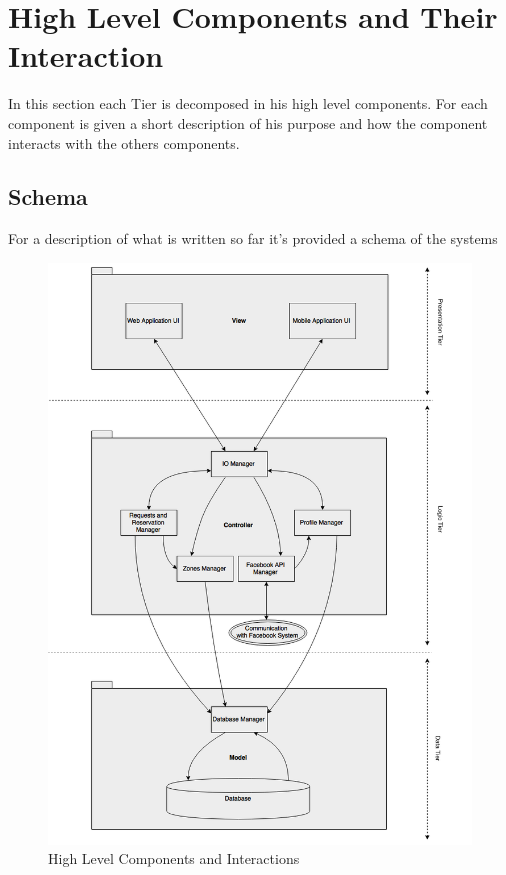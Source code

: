 \documentclass[../../../../dd.tex]{subfiles}
\begin{document}
	\section{High Level Components and Their Interaction}
		In this section each Tier is decomposed in his high level components. For each component is given a short description of his purpose and how the component interacts with the others components.
	
		

		

		

		\subsection{Schema}
			For a description of what is written so far it's provided a schema of the systems

			\begin{figure}[H]
				\centering
				\includegraphics[width=\textwidth, scale=0.5]{../images/HighLevelComponents}
			\caption{High Level Components and Interactions}\label{fig:HighLevelComponents}
		\end{figure}
	
\end{document}
